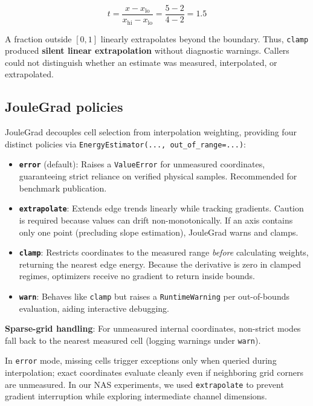 $$
t = \frac{x - x_{\text{lo}}}{x_{\text{hi}} - x_{\text{lo}}}
  = \frac{5 - 2}{4 - 2} = 1.5
$$

A fraction outside $[0, 1]$ linearly extrapolates beyond the boundary. Thus, \texttt{clamp} produced \textbf{silent linear extrapolation} without diagnostic warnings. Callers could not distinguish whether an estimate was measured, interpolated, or extrapolated.

\subsection{JouleGrad policies}

JouleGrad decouples cell selection from interpolation weighting, providing four distinct policies via \texttt{EnergyEstimator(..., out\_of\_range=...)}:

\begin{itemize}
    \item \textbf{\texttt{error}} (default): Raises a \texttt{ValueError} for unmeasured coordinates, guaranteeing strict reliance on verified physical samples. Recommended for benchmark publication.
    \item \textbf{\texttt{extrapolate}}: Extends edge trends linearly while tracking gradients. Caution is required because values can drift non-monotonically. If an axis contains only one point (precluding slope estimation), JouleGrad warns and clamps.
    \item \textbf{\texttt{clamp}}: Restricts coordinates to the measured range \emph{before} calculating weights, returning the nearest edge energy. Because the derivative is zero in clamped regimes, optimizers receive no gradient to return inside bounds.
    \item \textbf{\texttt{warn}}: Behaves like \texttt{clamp} but raises a \texttt{RuntimeWarning} per out-of-bounds evaluation, aiding interactive debugging.
\end{itemize}

\textbf{Sparse-grid handling}: For unmeasured internal coordinates, non-strict modes fall back to the nearest measured cell (logging warnings under \texttt{warn}).

In \texttt{error} mode, missing cells trigger exceptions only when queried during interpolation; exact coordinates evaluate cleanly even if neighboring grid corners are unmeasured. In our NAS experiments, we used \texttt{extrapolate} to prevent gradient interruption while exploring intermediate channel dimensions.


